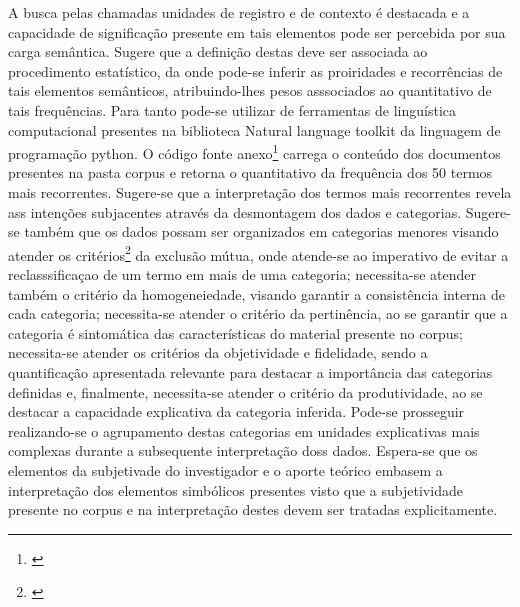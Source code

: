 \documentclass[
   article,       %
   12pt,          %
   oneside,       %
   a4paper,       %
   english,       %
   brazil,           %
   sumario=tradicional
   ]{abntex2}
\begin{document}
A busca pelas chamadas unidades de registro e de contexto é destacada e a capacidade de significação presente em tais elementos pode ser percebida por sua carga semântica. Sugere que a definição destas deve ser associada ao procedimento estatístico, da onde pode-se inferir as proiridades e recorrências de tais elementos semânticos, atribuindo-lhes pesos asssociados ao quantitativo de tais frequências. Para tanto pode-se utilizar de ferramentas de linguística computacional presentes na biblioteca Natural language toolkit \cite{Python_NLTK} da linguagem de programação python. O código fonte anexo\footnote{\cite{Python_NLTK_freqs}} carrega o conteúdo dos documentos presentes na pasta corpus e retorna o quantitativo da frequência dos 50 termos mais recorrentes. Sugere-se que a interpretação dos termos mais recorrentes revela ass intenções subjacentes através da desmontagem dos dados e categorias. Sugere-se também que os dados possam ser organizados em categorias menores visando atender os  critérios\footnote{\cite[p.295]{bardin_epistemologia}} da exclusão mútua, onde atende-se ao imperativo de evitar a reclasssificaçao de um termo em mais de uma categoria; necessita-se atender também o critério da homogeneiedade, visando garantir a consistência interna de cada categoria; necessita-se atender
o critério da pertinência, ao se garantir que a categoria é sintomática das características do material presente no corpus; necessita-se atender
os critérios da objetividade e fidelidade, sendo a quantificação apresentada relevante para destacar a importância das categorias definidas e, finalmente, 
necessita-se atender o critério da produtividade, ao se destacar a capacidade explicativa da categoria inferida. Pode-se prosseguir realizando-se o agrupamento destas categorias em unidades explicativas mais complexas durante a subsequente interpretação doss dados. Espera-se que os elementos da subjetivade do investigador e o aporte teórico embasem a interpretação dos elementos simbólicos presentes visto que a subjetividade presente no corpus e na interpretação destes devem ser tratadas explicitamente.
\end{document}
